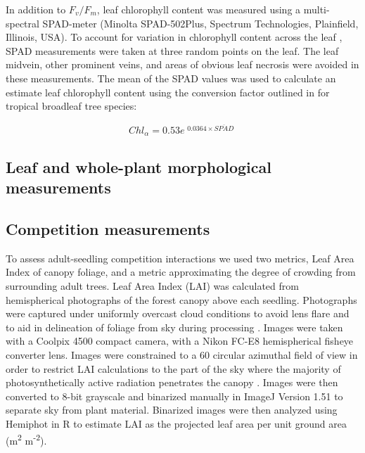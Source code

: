 \documentclass[a4paper, 11pt]{article}
\begin{document}
In addition to $F_v/F_m$, leaf chlorophyll content was measured using a multi-spectral SPAD-meter (Minolta SPAD-502Plus, Spectrum Technologies, Plainfield, Illinois, USA). To account for variation in chlorophyll content across the leaf \citep{}, SPAD measurements were taken at three random points on the leaf. The leaf midvein, other prominent veins, and areas of obvious leaf necrosis were avoided in these measurements. The mean of the SPAD values was used to calculate an estimate leaf chlorophyll content using the conversion factor outlined in \citet{} for tropical broadleaf tree species:

\begin{equation} \label{eq:chl-spad}
Chl_\alpha = 0.53e^{\begin{matrix} 0.0364 \times \overline{SPAD} \end{matrix}}
\end{equation}


\subsection{Leaf and whole-plant morphological measurements}

\subsection{Competition measurements}

To assess adult-seedling competition interactions we used two metrics, Leaf Area Index of canopy foliage, and a metric approximating the degree of crowding from surrounding adult trees. Leaf Area Index (LAI) was calculated from hemispherical photographs of the forest canopy above each seedling. Photographs were captured under uniformly overcast cloud conditions to avoid lens flare and to aid in delineation of foliage from sky during processing \citep{Frazer2001}. Images were taken with a Coolpix 4500 compact camera, with a Nikon FC-E8 hemispherical fisheye converter lens. Images were constrained to a 60\textdegree{} circular azimuthal field of view in order to restrict LAI calculations to the part of the sky where the majority of photosynthetically active radiation penetrates the canopy \citep{Jupp2009, Jonckheere2005}. Images were then converted to 8-bit grayscale and binarized manually in ImageJ Version 1.51 \citep{} to separate sky from plant material. Binarized images were then analyzed using Hemiphot \citep{} in R to estimate LAI as the projected leaf area per unit ground area (m\textsuperscript{2} m\textsuperscript{-2}).
\end{document}
